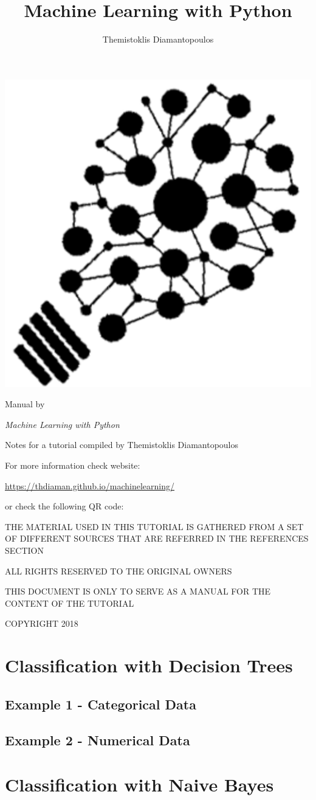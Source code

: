 \documentclass[10pt,twoside,a4paper,openany]{memoir}
\author{Themistoklis Diamantopoulos}
\title{Machine Learning with Python}
\date{}
\makeatletter
\def\maketitle{%
  \null
  \thispagestyle{empty}%
  \vfill

  \begin{center}
    \normalfont
    \centering

    \begin{minipage}{\linewidth}
    \centering
    \includegraphics[scale=0.3]{images/box-icon.png}
    \end{minipage}

    \vskip 1cm
    
    {\huge\@title\par}%
    \hrulefill\par
    \vskip 1cm

    {\LARGE\raggedleft Manual by \@author\par}%
  \end{center}%
  \vfill
  \null
  \clearpage
  }
\makeatother
\begin{document}
\maketitle

\frontmatter

\null
\thispagestyle{empty}%
\vfill

\begin{flushleft}
\textit{Machine Learning with Python}

Notes for a tutorial compiled by Themistoklis Diamantopoulos

\vskip 0.2cm

For more information check website:

\url{https://thdiaman.github.io/machinelearning/}

or check the following QR code:

\vskip 0.2cm


\bigskip

THE MATERIAL USED IN THIS TUTORIAL IS GATHERED FROM A SET OF DIFFERENT SOURCES THAT ARE REFERRED IN THE REFERENCES SECTION

\vskip 0.2cm
ALL RIGHTS RESERVED TO THE ORIGINAL OWNERS

\vskip 0.2cm
THIS DOCUMENT IS ONLY TO SERVE AS A MANUAL FOR THE CONTENT OF THE TUTORIAL

\vskip 0.2cm
COPYRIGHT 2018

\end{flushleft}



\mainmatter

\chapter{Classification with Decision Trees}

\section{Example 1 - Categorical Data}


\newpage
\section{Example 2 - Numerical Data}



\chapter{Classification with Naive Bayes}
\end{document}
